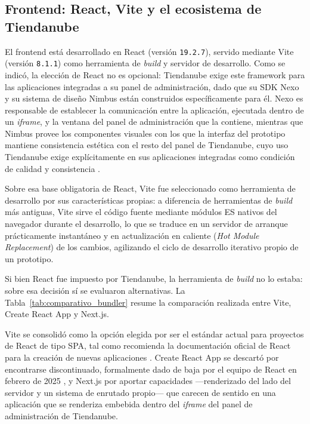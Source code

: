 \subsection{Frontend: React, Vite y el ecosistema de Tiendanube}
\label{sec:frontend-react-vite}

El frontend está desarrollado en React (versión \texttt{19.2.7}), servido mediante Vite (versión \texttt{8.1.1}) como herramienta de \emph{build} y servidor de desarrollo. Como se indicó, la elección de React no es opcional: Tiendanube exige este framework para las aplicaciones integradas a su panel de administración, dado que su SDK Nexo y su sistema de diseño Nimbus están construidos específicamente para él. Nexo es responsable de establecer la comunicación entre la aplicación, ejecutada dentro de un \emph{iframe}, y la ventana del panel de administración que la contiene, mientras que Nimbus provee los componentes visuales con los que la interfaz del prototipo mantiene consistencia estética con el resto del panel de Tiendanube, cuyo uso Tiendanube exige explícitamente en sus aplicaciones integradas como condición de calidad y consistencia \parencite{TiendanubeAPI2024}.

Sobre esa base obligatoria de React, Vite fue seleccionado como herramienta de desarrollo por sus características propias: a diferencia de herramientas de \emph{build} más antiguas, Vite sirve el código fuente mediante módulos ES nativos del navegador durante el desarrollo, lo que se traduce en un servidor de arranque prácticamente instantáneo y en actualización en caliente (\emph{Hot Module Replacement}) de los cambios, agilizando el ciclo de desarrollo iterativo propio de un prototipo.

Si bien React fue impuesto por Tiendanube, la herramienta de \emph{build} no lo estaba: sobre esa decisión sí se evaluaron alternativas. La Tabla~\ref{tab:comparativo_bundler} resume la comparación realizada entre Vite, Create React App y Next.js.

Vite se consolidó como la opción elegida por ser el estándar actual para proyectos de React de tipo SPA, tal como recomienda la documentación oficial de React para la creación de nuevas aplicaciones \parencite{ReactViteRecommendation2025}. Create React App se descartó por encontrarse discontinuado, formalmente dado de baja por el equipo de React en febrero de 2025 \parencite{ReactCRADeprecation2025}, y Next.js por aportar capacidades ---renderizado del lado del servidor y un sistema de enrutado propio--- que carecen de sentido en una aplicación que se renderiza embebida dentro del \emph{iframe} del panel de administración de Tiendanube.

